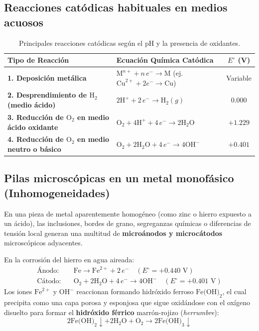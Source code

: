 \subsection{Reacciones catódicas habituales en medios acuosos}
\begin{table}[H]
    \centering
    \caption{Principales reacciones catódicas según el pH y la presencia de oxidantes.}
    \begin{tabular}{llc}
        \toprule
        \textbf{Tipo de Reacción} & \textbf{Ecuación Química Catódica} & \textbf{$E^\circ$ (V)} \\
        \midrule
        \textbf{1. Deposición metálica} & $\text{M}^{n+} + n\,e^- \longrightarrow \text{M}$ (ej. $\text{Cu}^{2+} + 2e^- \rightarrow \text{Cu}$) & Variable \\
        \textbf{2. Desprendimiento de $\text{H}_2$ (medio ácido)} & $2\text{H}^+ + 2\,e^- \longrightarrow \text{H}_2(g)$ & $0.000$ \\
        \textbf{3. Reducción de $\text{O}_2$ en medio ácido oxidante} & $\text{O}_2 + 4\text{H}^+ + 4\,e^- \longrightarrow 2\text{H}_2\text{O}$ & $+1.229$ \\
        \textbf{4. Reducción de $\text{O}_2$ en medio neutro o básico} & $\text{O}_2 + 2\text{H}_2\text{O} + 4\,e^- \longrightarrow 4\text{OH}^-$ & $+0.401$ \\
        \bottomrule
    \end{tabular}
    \label{tab:reacciones_catodicas}
\end{table}

\subsection{Pilas microscópicas en un metal monofásico (Inhomogeneidades)}
En una pieza de metal aparentemente homogéneo (como zinc o hierro expuesto a un ácido), las inclusiones, bordes de grano, segreganzas químicas o diferencias de tensión local generan una multitud de \textbf{microánodos y microcátodos} microscópicos adyacentes.

En la corrosión del hierro en agua aireada:
\begin{align}
    \text{Ánodo:} & \quad \text{Fe} \longrightarrow \text{Fe}^{2+} + 2\,e^- \quad (E^\circ = +0.440\text{ V}) \\
    \text{Cátodo:} & \quad \text{O}_2 + 2\text{H}_2\text{O} + 4\,e^- \longrightarrow 4\text{OH}^- \quad (E^\circ = +0.401\text{ V})
\end{align}
Los iones $\text{Fe}^{2+}$ y $\text{OH}^-$ reaccionan formando hidróxido ferroso $\text{Fe(OH)}_2$, el cual precipita como una capa porosa y esponjosa que sigue oxidándose con el oxígeno disuelto para formar el \textbf{hidróxido férrico} marrón-rojizo (\textit{herrumbre}):
\begin{equation}
    2\text{Fe(OH)}_2 \downarrow + 2\text{H}_2\text{O} + \text{O}_2 \longrightarrow 2\text{Fe(OH)}_3 \downarrow
\end{equation}

